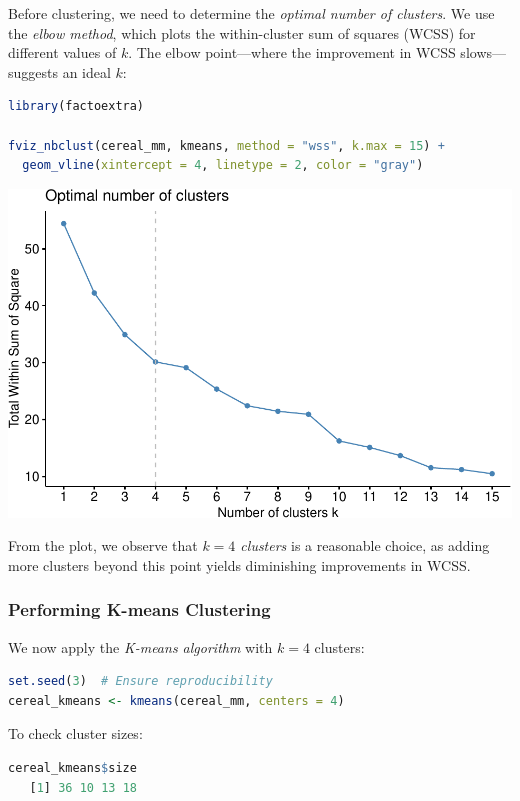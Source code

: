\documentclass[
]{book}
\theoremstyle{definition}
\theoremstyle{definition}
\theoremstyle{definition}
\theoremstyle{definition}
\theoremstyle{remark}
\begin{document}
Before clustering, we need to determine the \emph{optimal number of clusters}. We use the \emph{elbow method}, which plots the within-cluster sum of squares (WCSS) for different values of \(k\). The elbow point---where the improvement in WCSS slows---suggests an ideal \(k\):

\begin{lstlisting}[language=R]
library(factoextra)

fviz_nbclust(cereal_mm, kmeans, method = "wss", k.max = 15) + 
  geom_vline(xintercept = 4, linetype = 2, color = "gray")
\end{lstlisting}

\begin{center}\includegraphics[width=0.7\linewidth]{clustering_files/figure-latex/unnamed-chunk-9-1} \end{center}

From the plot, we observe that \emph{\(k = 4\) clusters} is a reasonable choice, as adding more clusters beyond this point yields diminishing improvements in WCSS.

\subsubsection*{Performing K-means Clustering}\label{performing-k-means-clustering}

We now apply the \emph{K-means algorithm} with \(k = 4\) clusters:

\begin{lstlisting}[language=R]
set.seed(3)  # Ensure reproducibility
cereal_kmeans <- kmeans(cereal_mm, centers = 4)
\end{lstlisting}

To check cluster sizes:

\begin{lstlisting}[language=R]
cereal_kmeans$size
   [1] 36 10 13 18
\end{lstlisting}
\end{document}

